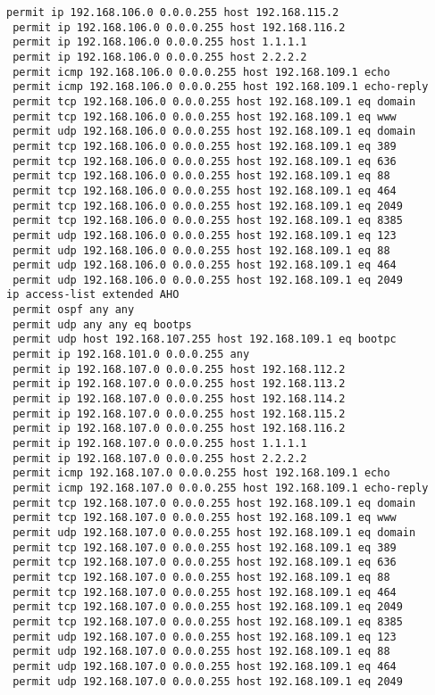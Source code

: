 \documentclass[14pt, a4paper]{extarticle}
\begin{document}
\begin{appendices}
\begin{lstlisting}[caption=Конфигурация устройства SW\_1\_L3\_IVANOV\label{list:conf_sw1_l3}]
 permit ip 192.168.106.0 0.0.0.255 host 192.168.115.2
 permit ip 192.168.106.0 0.0.0.255 host 192.168.116.2
 permit ip 192.168.106.0 0.0.0.255 host 1.1.1.1
 permit ip 192.168.106.0 0.0.0.255 host 2.2.2.2
 permit icmp 192.168.106.0 0.0.0.255 host 192.168.109.1 echo
 permit icmp 192.168.106.0 0.0.0.255 host 192.168.109.1 echo-reply
 permit tcp 192.168.106.0 0.0.0.255 host 192.168.109.1 eq domain
 permit tcp 192.168.106.0 0.0.0.255 host 192.168.109.1 eq www
 permit udp 192.168.106.0 0.0.0.255 host 192.168.109.1 eq domain
 permit tcp 192.168.106.0 0.0.0.255 host 192.168.109.1 eq 389
 permit tcp 192.168.106.0 0.0.0.255 host 192.168.109.1 eq 636
 permit tcp 192.168.106.0 0.0.0.255 host 192.168.109.1 eq 88
 permit tcp 192.168.106.0 0.0.0.255 host 192.168.109.1 eq 464
 permit tcp 192.168.106.0 0.0.0.255 host 192.168.109.1 eq 2049
 permit tcp 192.168.106.0 0.0.0.255 host 192.168.109.1 eq 8385
 permit udp 192.168.106.0 0.0.0.255 host 192.168.109.1 eq 123
 permit udp 192.168.106.0 0.0.0.255 host 192.168.109.1 eq 88
 permit udp 192.168.106.0 0.0.0.255 host 192.168.109.1 eq 464
 permit udp 192.168.106.0 0.0.0.255 host 192.168.109.1 eq 2049
ip access-list extended AHO
 permit ospf any any
 permit udp any any eq bootps
 permit udp host 192.168.107.255 host 192.168.109.1 eq bootpc
 permit ip 192.168.101.0 0.0.0.255 any
 permit ip 192.168.107.0 0.0.0.255 host 192.168.112.2
 permit ip 192.168.107.0 0.0.0.255 host 192.168.113.2
 permit ip 192.168.107.0 0.0.0.255 host 192.168.114.2
 permit ip 192.168.107.0 0.0.0.255 host 192.168.115.2
 permit ip 192.168.107.0 0.0.0.255 host 192.168.116.2
 permit ip 192.168.107.0 0.0.0.255 host 1.1.1.1
 permit ip 192.168.107.0 0.0.0.255 host 2.2.2.2
 permit icmp 192.168.107.0 0.0.0.255 host 192.168.109.1 echo
 permit icmp 192.168.107.0 0.0.0.255 host 192.168.109.1 echo-reply
 permit tcp 192.168.107.0 0.0.0.255 host 192.168.109.1 eq domain
 permit tcp 192.168.107.0 0.0.0.255 host 192.168.109.1 eq www
 permit udp 192.168.107.0 0.0.0.255 host 192.168.109.1 eq domain
 permit tcp 192.168.107.0 0.0.0.255 host 192.168.109.1 eq 389
 permit tcp 192.168.107.0 0.0.0.255 host 192.168.109.1 eq 636
 permit tcp 192.168.107.0 0.0.0.255 host 192.168.109.1 eq 88
 permit tcp 192.168.107.0 0.0.0.255 host 192.168.109.1 eq 464
 permit tcp 192.168.107.0 0.0.0.255 host 192.168.109.1 eq 2049
 permit tcp 192.168.107.0 0.0.0.255 host 192.168.109.1 eq 8385
 permit udp 192.168.107.0 0.0.0.255 host 192.168.109.1 eq 123
 permit udp 192.168.107.0 0.0.0.255 host 192.168.109.1 eq 88
 permit udp 192.168.107.0 0.0.0.255 host 192.168.109.1 eq 464
 permit udp 192.168.107.0 0.0.0.255 host 192.168.109.1 eq 2049

\end{lstlisting}
\end{appendices}
\end{document}
